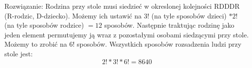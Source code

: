 \medskip
{} 
\medskip

Rozwiązanie:
Rodzina przy stole musi siedzieć w okreslonej kolejności RDDDR (R-rodzic, D-dziecko).
Możemy ich ustawić na $3!$ (na tyle sposobów dzieci) $* 2!$ (na tyle sposobów rodzice)  $= 12$ sposobów. 
Następnie traktując rodzinę jako jeden element permutujemy ją wraz z pozostałymi osobami siedzącymi przy
stole. Możemy to zrobić na $6!$ sposobów. Wszystkich sposobów rozsadzenia ludzi przy stole jest:
$$
2! * 3! * 6! = 8 640
$$
